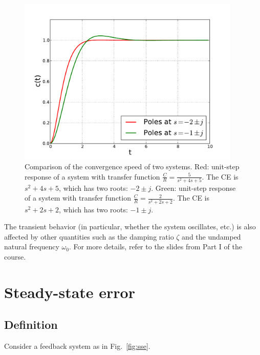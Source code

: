 \documentclass[a4paper,11pt]{report}
\theoremstyle{definition}
\begin{document}
\begin{figure}[H]
  \includegraphics[height=8cm]{fig/convergence-comp.pdf}
  \caption{Comparison of the convergence speed of two systems. Red:
    unit-step response of a system with transfer function
    $\frac{C}{R}=\frac{5}{s^2+4s+5}$. The CE is $s^2+4s+5$, which has
    two roots: $-2\pm j$. Green: unit-step response of a system with
    transfer function $\frac{C}{R}=\frac{2}{s^2+2s+2}$. The CE is
    $s^2+2s+2$, which has two roots: $-1\pm j$.}
  \label{fig:convergence-comp}
\end{figure}


The transient behavior (in particular, whether the system oscillates,
etc.) is also affected by other quantities such as the damping ratio
$\zeta$ and the undamped natural frequency $\omega_0$. For more
details, refer to the slides from Part I of the course.

\section{Steady-state error}

\subsection{Definition}

Consider a feedback system as in Fig.~\ref{fig:sse}.
\end{document}
